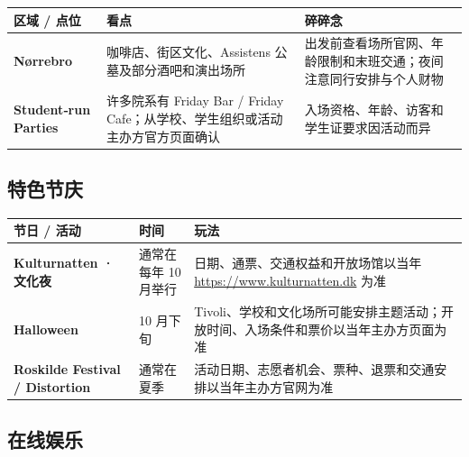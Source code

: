 \begin{table}[H]
  \scriptsize
  \centering
  \renewcommand{\arraystretch}{1.2}
  \setlength{\tabcolsep}{5pt}
  \label{tab:citylife}
  \begin{tabularx}{\textwidth}{p{} p{} X}
    \toprule
    \textbf{区域 / 点位} & \textbf{看点} & \textbf{碎碎念} \\
    \midrule
    \textbf{Nørrebro} & 咖啡店、街区文化、Assistens 公墓及部分酒吧和演出场所 & 出发前查看场所官网、年龄限制和末班交通；夜间注意同行安排与个人财物 \\
    \textbf{Student‐run Parties} & 许多院系有 Friday Bar / Friday Cafe；从学校、学生组织或活动主办方官方页面确认 & 入场资格、年龄、访客和学生证要求因活动而异 \\
    \bottomrule
  \end{tabularx}
\end{table}

\subsection{特色节庆}

\begin{table}[H]
  \scriptsize
  \centering
  \renewcommand{\arraystretch}{1.2}
  \setlength{\tabcolsep}{5pt}
  \label{tab:festivals}
  \begin{tabularx}{\textwidth}{p{} p{} X}
    \toprule
    \textbf{节日 / 活动} & \textbf{时间} & \textbf{玩法} \\
    \midrule
    \textbf{Kulturnatten · 文化夜} & 通常在每年 10 月举行 & 日期、通票、交通权益和开放场馆以当年 \url{https://www.kulturnatten.dk} 为准 \\
    \textbf{Halloween} & 10 月下旬 & Tivoli、学校和文化场所可能安排主题活动；开放时间、入场条件和票价以当年主办方页面为准 \\
    \textbf{Roskilde Festival / Distortion} & 通常在夏季 & 活动日期、志愿者机会、票种、退票和交通安排以当年主办方官网为准 \\
    \bottomrule
  \end{tabularx}
\end{table}

\subsection{在线娱乐}


